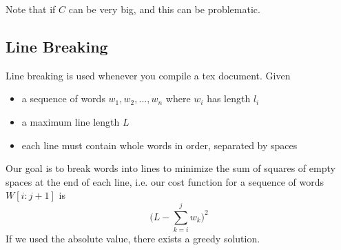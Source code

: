 \documentclass{article}
\begin{document}
    Note that if $C$ can be very big, and this can be problematic. 

  \subsection{Line Breaking}

    \begin{definition}
      Line breaking is used whenever you compile a tex document. Given 
      \begin{itemize}
        \item a sequence of words $w_1, w_2, ..., w_n$ where $w_i$ has length $l_i$
        \item a maximum line length $L$
        \item each line must contain whole words in order, separated by spaces
      \end{itemize}
      Our goal is to break words into lines to minimize the sum of squares of empty spaces at the end of each line, i.e. our cost function for a sequence of words $W[i:j+1]$ is 
      \begin{equation}
        \bigg( L - \sum_{k=i}^j w_k \bigg)^2
      \end{equation} 
      If we used the absolute value, there exists a greedy solution. 
    \end{definition}
\end{document}

